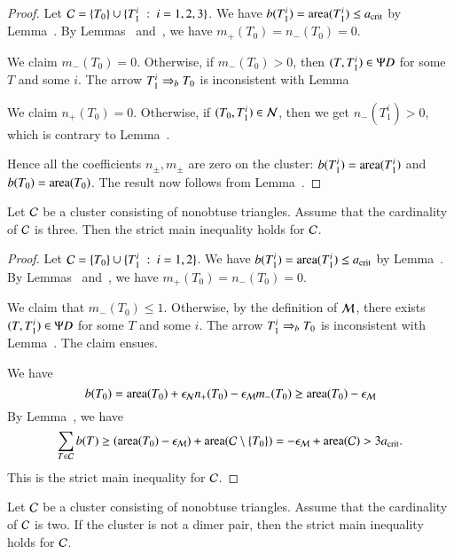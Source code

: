 \begin{proof}  
  Let $\mathcal C = \{T_0\}\cup \{T_1^i \ :\  i=1,2,3\}$.  We have $b(T_1^i) =
  {\operatorname{area}}(T_1^i)\le a_\text{crit}$ by Lemma~.  By
  Lemmas~ and~, we have
  $m_+(T_0)=n_-(T_0)=0$.

  We claim $m_-(T_0)=0$.  Otherwise, if $m_-(T_0) >0$, then
  $(T,T_1^i)\in\Psi D$ for some $T$ and some $i$.  The arrow $T_1^i\Rightarrow_{b}
  T_0$ is inconsistent with Lemma~

  We claim $n_+(T_0)=0$.  Otherwise, if $(T_0,T_1^i)\in\mathcal N$, then we
  get $n_-(T_1^i)>0$, which is contrary to Lemma~.

  Hence all the coefficients $n_\pm,m_\pm$ are zero on the cluster:
  $b(T_1^i)={\operatorname{area}}(T_1^i)$ and $b(T_0) = {\operatorname{area}}(T_0)$.  The result now
  follows from Lemma~.
\end{proof}

\begin{lemma}
  Let $\mathcal C$ be a cluster consisting of nonobtuse triangles.  Assume
  that the cardinality of $\mathcal C$ is three.  Then the strict main
  inequality holds for $\mathcal C$.
\end{lemma}

\begin{proof}  
  Let $\mathcal C = \{T_0\}\cup \{T_1^i \ :\  i=1,2\}$.  We have $b(T_1^i) =
  {\operatorname{area}}(T_1^i)\le a_\text{crit}$ by Lemma~.  By
  Lemmas~ and~, we have
  $m_+(T_0)=n_-(T_0)=0$.

  We claim that $m_-(T_0)\le 1$.  Otherwise, by the definition of
  $\mathcal M$, there exists $(T,T_1^i)\in\Psi D$ for some $T$ and some $i$.  The
  arrow $T_1^i\Rightarrow_{b} T_0$ is inconsistent with Lemma~.
  The claim ensues.

We have
\[
b(T_0) = {\operatorname{area}}(T_0) + \epsilon_{\mathcal N} n_+(T_0) - \epsilon_{\mathcal M} m_-(T_0) 
\ge {\operatorname{area}}(T_0) - \epsilon_{\mathcal M}
\]
By Lemma~, we have
\[
\sum_{T\in\mathcal C} b(T) \ge ({\operatorname{area}}(T_0) - \epsilon_{\mathcal M}) +  {\operatorname{area}}(\mathcal C\setminus \{T_0\}) 
= -\epsilon_{\mathcal M}+ {\operatorname{area}}(\mathcal C) > 3a_\text{crit}.
\]
This is the strict main inequality for $\mathcal C$.
\end{proof}

\begin{lemma} 
  Let $\mathcal C$ be a cluster consisting of nonobtuse triangles.  Assume
  that the cardinality of $\mathcal C$ is two.  If the cluster is not a dimer
  pair, then the strict main inequality holds for $\mathcal C$.
\end{lemma}

